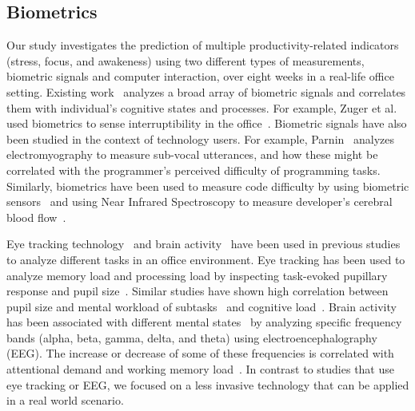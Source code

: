 \subsection{Biometrics}
Our study investigates the prediction of multiple productivity-related indicators (stress, focus, and awakeness) using two different types of measurements, biometric signals and computer interaction, over eight weeks in a real-life office setting.
Existing work~\cite{sano2013stress,healey2005detecting,wijsman2011towards,zuger2015interruptibility,goyal2017intelligent,Parnin2011,Nakagawa2014,Radevski2015} analyzes a broad array of biometric signals and correlates them with individual's cognitive states and processes.
For example, Zuger et al.~\cite{zuger18} used biometrics to sense interruptibility in the office~\cite{zuger18}.
Biometric signals have also been studied in the context of technology users. For example, Parnin~\cite{Parnin2011} analyzes electromyography to measure sub-vocal utterances, and how these might be correlated with the programmer's perceived difficulty of programming tasks. Similarly, biometrics have been used to measure code difficulty by using biometric sensors~\cite{fritz2014using}
and using Near Infrared Spectroscopy to measure developer's cerebral blood flow~\cite{Nakagawa2014}.

Eye tracking technology~\cite{Bednarik2006,Crosby1990,Rodeghero2014} and brain activity~\cite{Ikutani2014,Siegmund2014} 
have been used in previous studies to analyze different tasks in an office environment.
Eye tracking has been used to analyze memory load and processing load by inspecting task-evoked pupillary response and pupil size~\cite{beatty82}. Similar studies have shown high correlation between pupil size and mental workload of subtasks~\cite{beatty82} and cognitive load~\cite{Klingner10}.
Brain activity has been associated with different mental states~\cite{Berger29} by analyzing specific frequency bands (alpha, beta, gamma, delta, and theta) using electroencephalography (EEG). The increase or decrease of some of these frequencies is correlated with
attentional demand and working memory load~\cite{Smith05,sterman93}.
In contrast to studies that use eye tracking or EEG, we focused on a less invasive technology that can be applied in a real world scenario.




